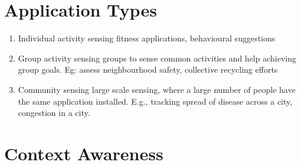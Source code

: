 \section{Application Types}
    \begin{enumerate}
        \item  Individual activity sensing fitness applications, behavioural suggestions

        \item  Group activity sensing groups to sense common activities and help achieving group goals. Eg: assess neighbourhood safety, collective recycling efforts 
        
        \item Community sensing large scale sensing, where a large number of people have the same application installed. E.g., tracking spread of disease across a city, congestion in a city.
    \end{enumerate}
    
\section{Context Awareness}


